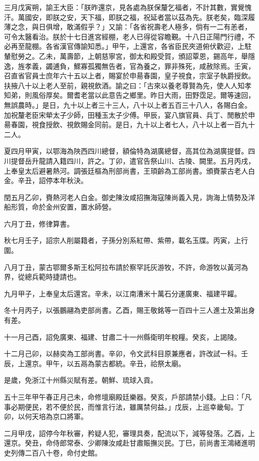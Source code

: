 \begin{pinyinscope}
三月戊寅朔，諭王大臣：「朕昨還京，見各處為朕保釐乞福者，不計其數，實覺愧汗。萬國安，即朕之安，天下福，即朕之福，祝延者當以茲為先。朕老矣，臨深履薄之念，與日俱增，敢滿假乎？」又諭：「各省祝壽老人極多，倘有一二有恙者，可令太醫看治。朕於十七日進宮經棚，老人已得從容瞻覲。十八日正陽門行禮，不必再至龍棚。各省漢官傳諭知悉。」甲午，上還宮，各省臣民夾道俯伏歡迎，上駐輦慰勞之。乙未，萬壽節，上朝慈寧宮，御太和殿受賀，頒詔覃恩，錫高年，舉隱逸，旌孝義，蠲逋負，鰥寡孤獨無告者，官為養之，罪非殊死，咸赦除焉。壬寅，召直省官員士庶年六十五以上者，賜宴於申昜春園，皇子視食，宗室子執爵授飲。扶掖八十以上老人至前，親視飲酒。諭之曰：「古來以養老尊賢為先，使人人知孝知弟，則風俗厚矣。爾耆老當以此意告之鄉里。昨日大雨，田野霑足。爾等速回，無誤農時。」是日，九十以上者三十三人，八十以上者五百三十八人，各賜白金。加祝釐老臣宋犖太子少師，田種玉太子少傅。甲辰，宴八旗官員、兵丁、閒散於申昜春園，視食授飲、視飲賜金同前。是日，九十以上者七人，八十以上者一百九十二人。

夏四月甲寅，以鄂海為陜西四川總督，額倫特為湖廣總督，高其位為湖廣提督。四川提督岳升龍請入籍四川，許之。丁卯，遣官告祭山川、古陵、闕里。五月丙戌，上奉皇太后避暑熱河。調張廷樞為刑部尚書，王頊齡為工部尚書。頒賚蒙古老人白金。辛丑，詔停本年秋決。

閏五月乙卯，賚熱河老人白金。御史陳汝咸招撫海寇陳尚義入見，詢海上情勢及洋船形質，命於金州安置，置水師營。

六月丁丑，修律算書。

秋七月壬子，詔宗人削屬籍者，子孫分別系紅帶、紫帶，載名玉牒。丙寅，上行圍。

八月丁丑，蒙古鄂爾多斯王松阿拉布請於察罕託灰游牧，不許，命游牧以黃河為界，從總兵範時捷請也。

九月甲子，上奉皇太后還宮。辛未，以江南漕米十萬石分運廣東、福建平糶。

冬十月丙子，以張鵬翮為吏部尚書。乙酉，賜王敬銘等一百四十三人進士及第出身有差。

十一月己酉，詔免廣東、福建、甘肅二十一州縣衛明年稅糧。癸亥，上謁陵。

十二月己卯，以赫奕為工部尚書。辛卯，令文武科目原兼應者，許改試一科。壬辰，上還京。甲午，以五鬲為蒙古都統。辛丑，祫祭太廟。

是歲，免浙江十州縣災賦有差。朝鮮、琉球入貢。

五十三年甲午春正月己未，命修壇廟殿廷樂器。癸亥，戶部請禁小錢。上曰：「凡事必期便民，若不便於民，而惟言行法，雖厲禁何益。」戊辰，上巡幸畿甸。丁卯，以何天培為京口將軍。

二月甲戌，詔停今年秋審，矜疑人犯，審理具奏，配流以下，減等發落。乙酉，上還京。癸丑，命侍郎常泰、少卿陳汝咸赴甘肅賑撫災民。丁巳，前尚書王鴻緒進明史列傳二百八十卷，命付史館。


\end{pinyinscope}
